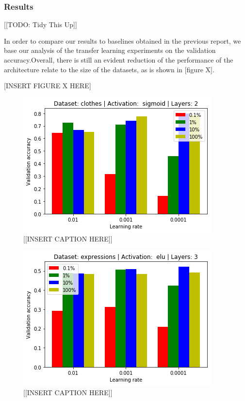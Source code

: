 \documentclass{article}
\begin{document}
\subsubsection{\textbf{Results}}

[[TODO: Tidy This Up]]

In order to compare our results to baselines obtained in the previous report, we base our analysis of the transfer learning experiments on the validation accuracy.Overall, there is still an evident reduction of the performance of the architecture relate to the size of the datasets, as is shown in [figure X].

[INSERT FIGURE X HERE]

\begin{figure}[tb]
    \vskip 5mm
        \begin{center}
            \includegraphics[scale=0.5]{accuracy_reduction_00.png}
            \caption{[[INSERT CAPTION HERE]]}
            \label{fig:2}
        \end{center}
    \vskip -5mm
\end{figure}

\begin{figure}[tb]
    \vskip 5mm
        \begin{center}
            \includegraphics[scale=0.5]{accuracy_reduction_01.png}
            \caption{[[INSERT CAPTION HERE]]}
            \label{fig:3}
        \end{center}
    \vskip -5mm
\end{figure}
\end{document}
